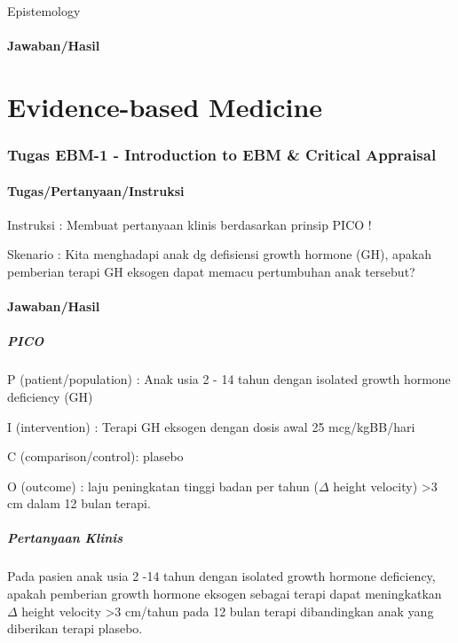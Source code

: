 \documentclass[
  letterpaper,
  DIV=11,
  numbers=noendperiod]{scrreprt}
\let\oldparagraph\paragraph
\renewcommand{\paragraph}[1]{\oldparagraph{#1}\mbox{}}
\let\oldsubparagraph\subparagraph
\renewcommand{\subparagraph}[1]{\oldsubparagraph{#1}\mbox{}}
\begin{document}
Epistemology

\paragraph{Jawaban/Hasil}\label{jawabanhasil-1}

\section{Evidence-based Medicine}\label{evidence-based-medicine-1}

\subsubsection{Tugas EBM-1 - Introduction to EBM \& Critical
Appraisal}\label{tugas-ebm-1---introduction-to-ebm-critical-appraisal}

\paragraph{Tugas/Pertanyaan/Instruksi}\label{tugaspertanyaaninstruksi-2}

Instruksi : Membuat pertanyaan klinis berdasarkan prinsip PICO !

Skenario : Kita menghadapi anak dg defisiensi growth hormone (GH),
apakah pemberian terapi GH eksogen dapat memacu pertumbuhan anak
tersebut?

\paragraph{Jawaban/Hasil}\label{jawabanhasil-2}

\subparagraph{PICO}\label{pico}

P (patient/population) : Anak usia 2 - 14 tahun dengan isolated growth
hormone deficiency (GH)

I (intervention) : Terapi GH eksogen dengan dosis awal 25 mcg/kgBB/hari

C (comparison/control): plasebo

O (outcome) : laju peningkatan tinggi badan per tahun (\(\Delta\) height
velocity) \textgreater3 cm dalam 12 bulan terapi.

\subparagraph{Pertanyaan Klinis}\label{pertanyaan-klinis}

Pada pasien anak usia 2 -14 tahun dengan isolated growth hormone
deficiency, apakah pemberian growth hormone eksogen sebagai terapi dapat
meningkatkan \(\Delta\) height velocity \textgreater3 cm/tahun pada 12
bulan terapi dibandingkan anak yang diberikan terapi plasebo.
\end{document}
